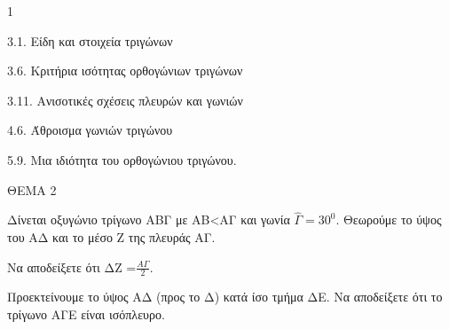 \begin{ylh}{1}
    \item 3.1. Είδη και στοιχεία τριγώνων
    \item 3.6. Κριτήρια ισότητας ορθογώνιων τριγώνων
    \item 3.11. Ανισοτικές σχέσεις πλευρών και γωνιών
    \item 4.6. Άθροισμα γωνιών τριγώνου
    \item 5.9. Μια ιδιότητα του ορθογώνιου τριγώνου.
\end{ylh}

ΘΕΜΑ 2

Δίνεται οξυγώνιο τρίγωνο ΑΒΓ με ΑΒ\textless ΑΓ και γωνία $\widehat{\Gamma} = 30^{0}$. Θεωρούμε το ύψος του ΑΔ και το μέσο Ζ της πλευράς ΑΓ.

\begin{alist}
\item Να αποδείξετε ότι ΔΖ =$\frac{Α\Gamma}{2}$. 

\item Προεκτείνουμε το ύψος ΑΔ (προς το Δ) κατά ίσο τμήμα ΔΕ. Να αποδείξετε ότι το τρίγωνο ΑΓΕ είναι ισόπλευρο. 
\end{alist}
